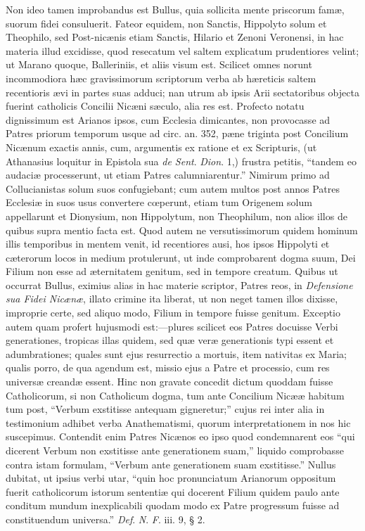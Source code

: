 Non ideo
tamen improbandus est Bullus, quia sollicita mente priscorum famæ,
suorum fidei consuluerit. Fateor equidem, non Sanctis, Hippolyto solum
et Theophilo, sed Post-nicænis etiam Sanctis, Hilario et Zenoni
Veronensi, in hac materia illud excidisse, quod resecatum vel saltem
explicatum prudentiores velint; ut Marano quoque, Balleriniis, et
aliis visum est. Scilicet omnes norunt incommodiora hæc gravissimorum
scriptorum verba ab hæreticis saltem recentioris ævi in partes suas
adduci; nan utrum ab ipsis Arii sectatoribus objecta fuerint
catholicis Concilii Nicæni sæculo, alia res est. Profecto notatu
dignissimum est Arianos ipsos, cum Ecclesia dimicantes, non provocasse
ad Patres priorum temporum usque ad circ. an. 352, pæne triginta post
Concilium Nicænum exactis annis, cum, argumentis ex ratione et ex
Scripturis, (ut Athanasius loquitur in Epistola sua \emph{de Sent}. \emph{Dion}.
1,) frustra petitis, ``tandem eo audaciæ processerunt, ut etiam
Patres calumniarentur.'' Nimirum primo ad Collucianistas solum suos
confugiebant; cum autem multos post annos Patres Ecclesiæ in suos
usus convertere cœperunt, etiam tum Origenem solum appellarunt et
Dionysium, non Hippolytum, non Theophilum, non alios illos de quibus
supra mentio facta est. Quod autem ne versutissimorum quidem hominum
illis temporibus in mentem venit, id recentiores ausi, hos ipsos
Hippolyti et cæterorum locos in medium protulerunt, ut inde
comprobarent dogma suum, Dei Filium non esse ad æternitatem genitum,
sed in tempore creatum. Quibus ut occurrat Bullus, eximius alias in
hac materie scriptor, Patres reos, in \emph{Defensione sua Fidei Nicænæ},
illato crimine ita liberat, ut non neget tamen illos dixisse,
improprie certe, sed aliquo modo, Filium in tempore fuisse genitum.
Exceptio autem quam profert hujusmodi est:—plures scilicet eos
Patres docuisse Verbi generationes, tropicas illas quidem, sed quæ
veræ generationis typi essent et adumbrationes; quales sunt ejus
resurrectio a mortuis, item nativitas ex Maria; qualis porro, de qua
agendum est, missio ejus a Patre et processio, cum res universæ
creandæ essent. Hinc non gravate concedit dictum quoddam fuisse
Catholicorum, si non Catholicum dogma, tum ante Concilium Nicææ
habitum tum post, ``Verbum exstitisse antequam gigneretur;'' cujus
rei inter alia in testimonium adhibet verba Anathematismi, quorum
interpretationem in nos hic suscepimus. Contendit enim Patres Nicænos
eo ipso quod condemnarent eos ``qui dicerent Verbum non exstitisse
ante generationem suam,'' liquido comprobasse contra istam formulam, ``Verbum ante generationem suam
exstitisse.'' Nullus dubitat, ut
ipsius verbi utar, ``quin hoc pronunciatum Arianorum oppositum fuerit
catholicorum istorum sententiæ qui docerent Filium quidem paulo ante
conditum mundum inexplicabili quodam modo ex Patre progressum fuisse
ad constituendum universa.'' \emph{Def}. \emph{N}. \emph{F}. iii. 9,
§ 2.

